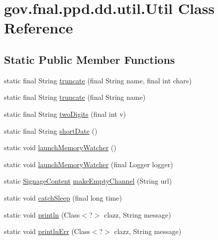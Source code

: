 \hypertarget{classgov_1_1fnal_1_1ppd_1_1dd_1_1util_1_1Util}{\section{gov.\-fnal.\-ppd.\-dd.\-util.\-Util Class Reference}
\label{classgov_1_1fnal_1_1ppd_1_1dd_1_1util_1_1Util}
}
\subsection*{Static Public Member Functions}
\begin{DoxyCompactItemize}
\item 
static final String \hyperlink{classgov_1_1fnal_1_1ppd_1_1dd_1_1util_1_1Util_a500e645950d17c59b68a157876f215c3}{truncate} (final String name, final int chars)
\item 
static final String \hyperlink{classgov_1_1fnal_1_1ppd_1_1dd_1_1util_1_1Util_ac1dda85f618a69dcf108f4ac5ae5bfd0}{truncate} (final String name)
\item 
static final String \hyperlink{classgov_1_1fnal_1_1ppd_1_1dd_1_1util_1_1Util_abd168ecd415159fe699847769f907ccc}{two\-Digits} (final int v)
\item 
static final String \hyperlink{classgov_1_1fnal_1_1ppd_1_1dd_1_1util_1_1Util_ae4d9723ca0fda1629427bfee39d9c47e}{short\-Date} ()
\item 
static void \hyperlink{classgov_1_1fnal_1_1ppd_1_1dd_1_1util_1_1Util_aceba274f9fff7a6d4022d977f27e1a89}{launch\-Memory\-Watcher} ()
\item 
static void \hyperlink{classgov_1_1fnal_1_1ppd_1_1dd_1_1util_1_1Util_a14a313b4148f9d231f1f5c6c7385cfc1}{launch\-Memory\-Watcher} (final Logger logger)
\item 
static \hyperlink{interfacegov_1_1fnal_1_1ppd_1_1dd_1_1signage_1_1SignageContent}{Signage\-Content} \hyperlink{classgov_1_1fnal_1_1ppd_1_1dd_1_1util_1_1Util_aac24d11cbe3cf38954965cd285954857}{make\-Empty\-Channel} (String url)
\item 
static void \hyperlink{classgov_1_1fnal_1_1ppd_1_1dd_1_1util_1_1Util_ab7b5b1e401eb2fcf485e0f75aced8a24}{catch\-Sleep} (final long time)
\item 
static void \hyperlink{classgov_1_1fnal_1_1ppd_1_1dd_1_1util_1_1Util_a79b524ff854cd49170ad6d03dc12d66c}{println} (Class$<$?$>$ clazz, String message)
\item 
static void \hyperlink{classgov_1_1fnal_1_1ppd_1_1dd_1_1util_1_1Util_a3152af255123f8d4b4663563834f1cf2}{println\-Err} (Class$<$?$>$ clazz, String message)

\end{DoxyCompactItemize}
